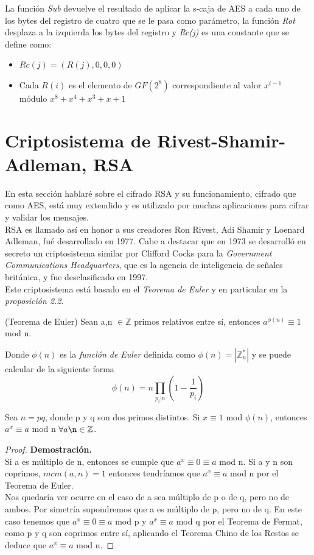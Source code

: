 La función \emph{Sub} devuelve el resultado de aplicar la s-caja de AES a cada uno de los bytes del registro de cuatro que se le pasa como parámetro, la función \emph{Rot} desplaza a la izquierda los bytes del registro y \emph{Rc(j)} es una constante que se define como:
\begin{itemize}
	\item $Rc(j)=(R(j),0,0,0)$
	\item Cada $R(i)$ es el elemento de $GF(2^8)$ correspondiente al valor $x^{i-1}$ módulo $x^8+x^4+x^3+x+1$
\end{itemize}

\section{Criptosistema de Rivest-Shamir-Adleman, RSA}
En esta sección hablaré sobre el cifrado RSA y su funcionamiento, cifrado que como AES, está muy extendido y es utilizado por muchas aplicaciones para cifrar y validar los mensajes.\\
RSA es llamado así en honor a sus creadores Ron Rivest, Adi Shamir y Loenard Adleman, fué desarrollado en 1977. Cabe a destacar que en 1973 se desarrolló en secreto un criptosistema similar por Clifford Cocks para la \emph{Government Communications Headquarters}, que es la agencia de inteligencia de señales británica, y fue desclasificado en 1997\cite{cliffordCocks}.\\
Este criptosistema está basado en el \emph{Teorema de Euler} y en particular en la \emph{proposición 2.2}.
\begin{teorema}
	(Teorema de Euler) Sean a,n $\in \mathbb{Z}$ primos relativos entre sí, entonces $a^{\phi(n)}\equiv 1$ mod n.
\end{teorema}
Donde $\phi(n)$ es la \emph{funclón de Euler} definida como $\phi(n)=|\mathbb{Z}^*_n|$ y se puede calcular de la siguiente forma $$\phi(n)=n\prod_{p_i|n}(1-\frac{1}{p_i})$$


\begin{proposicion}
	Sea $n = pq$, donde p y q son dos primos distintos. Si $x\equiv 1$ mod $\phi(n)$, entonces $a^x\equiv a$ mod n $\forall a \n \in \mathbb{Z}$.\\
	\begin{proof}
		\textbf{Demostración.}\\
		Si a es múltiplo de n, entonces se cumple que $a^x \equiv 0 \equiv a$ mod n. Si a y n son coprimos, $mcm(a,n) = 1$ entonces tendríamos que $a^x \equiv a$ mod n por el Teorema de Euler.\\
		Nos quedaría ver ocurre en el caso de a sea múltiplo de p o de q, pero no de ambos. Por simetría supondremos que a es múltiplo de p, pero no de q. En este caso tenemos que $a^x \equiv 0 \equiv a$ mod p  y $a^x \equiv a$ mod q por el Teorema de Fermat, como p y q son coprimos entre sí, aplicando el Teorema Chino de los Restos se deduce que $a^x \equiv a$ mod n. \blacksquare
	\end{proof}
\end{proposicion}

